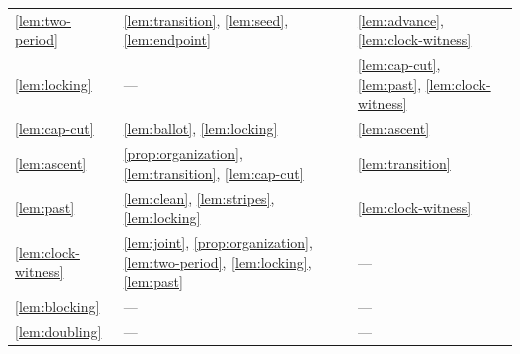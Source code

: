 \begin{longtable}{@{}>{\raggedright\arraybackslash}p{.14\linewidth}>{\raggedright\arraybackslash}p{.40\linewidth}>{\raggedright\arraybackslash}p{.38\linewidth}@{}}
\ref{lem:two-period} & \ref{lem:transition}, \ref{lem:seed}, \ref{lem:endpoint} & \ref{lem:advance}, \ref{lem:clock-witness} \\
\ref{lem:locking} & --- & \ref{lem:cap-cut}, \ref{lem:past}, \ref{lem:clock-witness} \\
\ref{lem:cap-cut} & \ref{lem:ballot}, \ref{lem:locking} & \ref{lem:ascent} \\
\ref{lem:ascent} & \ref{prop:organization}, \ref{lem:transition}, \ref{lem:cap-cut} & \ref{lem:transition} \\
\ref{lem:past} & \ref{lem:clean}, \ref{lem:stripes}, \ref{lem:locking} & \ref{lem:clock-witness} \\
\ref{lem:clock-witness} & \ref{lem:joint}, \ref{prop:organization}, \ref{lem:two-period}, \ref{lem:locking}, \ref{lem:past} & --- \\
\ref{lem:blocking} & --- & --- \\
\ref{lem:doubling} & --- & --- \\
\bottomrule
\end{longtable}
